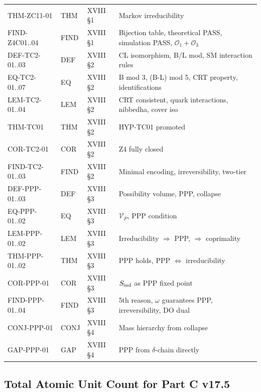 \documentclass[12pt, a4paper]{article}
\begin{document}
\begin{center}
{\begin{longtable}{p{3.5cm} p{2.0cm} p{2.5cm} p{4.5cm}}
THM-ZC11-01     & THM & XVIII §1 & Markov irreducibility \\
FIND-Z4C01..04  & FIND & XVIII §1 & Bijection table, theoretical PASS, simulation PASS, $\mathcal{O}_1+\mathcal{O}_3$ \\
\midrule
DEF-TC2-01..03  & DEF & XVIII §2 & CL isomorphism, B/L mod, SM interaction rules \\
EQ-TC2-01..07   & EQ  & XVIII §2 & B mod 3, (B-L) mod 5, CRT property, identifications \\
LEM-TC2-01..04  & LEM & XVIII §2 & CRT consistent, quark interactions, nibbedha, cover iso \\
THM-TC01        & THM & XVIII §2 & HYP-TC01 promoted \\
COR-TC2-01      & COR & XVIII §2 & Z4 fully closed \\
FIND-TC2-01..03 & FIND & XVIII §2 & Minimal encoding, irreversibility, two-tier \\
\midrule
DEF-PPP-01..03  & DEF & XVIII §3 & Possibility volume, PPP, collapse \\
EQ-PPP-01..02   & EQ  & XVIII §3 & $\mathcal{V}_P$, PPP condition \\
LEM-PPP-01..02  & LEM & XVIII §3 & Irreducibility $\Rightarrow$ PPP, $\Rightarrow$ coprimality \\
THM-PPP-01..02  & THM & XVIII §3 & PPP holds, PPP $\Leftrightarrow$ irreducibility \\
COR-PPP-01      & COR & XVIII §3 & $S_{\rm ind}$ as PPP fixed point \\
FIND-PPP-01..04 & FIND & XVIII §3 & 5th reason, $\omega$ guarantees PPP, irreversibility, DO dual \\
CONJ-PPP-01     & CONJ & XVIII §4 & Mass hierarchy from collapse \\
GAP-PPP-01      & GAP & XVIII §4 & PPP from $\delta$-chain directly \\
\bottomrule
\end{longtable}
}
\end{center}

\subsection{Total Atomic Unit Count for Part C v17.5}
\end{document}
